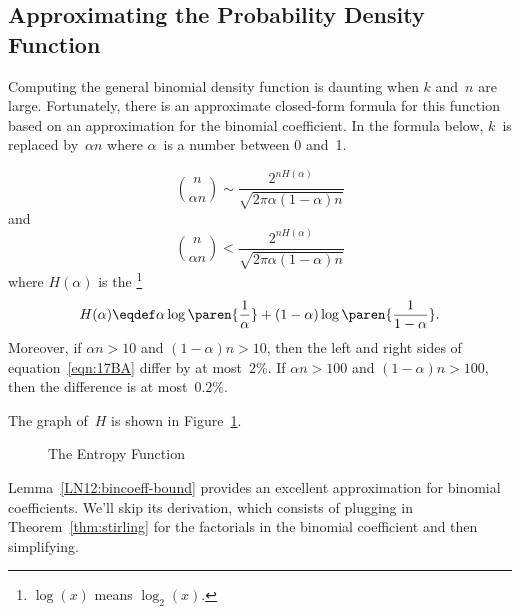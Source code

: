 \begin{editingnotes}

\subsection{Approximating the Probability Density Function}

Computing the general binomial density function is daunting when $k$
and~$n$ are large.  Fortunately, there is an approximate closed-form
formula for this function based on an approximation for the binomial
coefficient.  In the formula below, $k$~is replaced by~$\alpha n$
where $\alpha$~is a number between 0 and~1.
%
\begin{lemma}\label{LN12:bincoeff-bound}
\begin{equation}\label{eqn:17BA}
\binom{n}{\alpha n}
        \sim \frac{2^{n H(\alpha)}}{\sqrt{2 \pi \alpha (1 - \alpha) n}}
\end{equation}
and
\begin{equation}\label{eqn:17A3}
\binom{n}{\alpha n} < \frac{ 2^{n H(\alpha)} }
                           { \sqrt{2 \pi \alpha (1 - \alpha) n} }
\end{equation}
where $H(\alpha)$ is the \footnote{$\log(x)$
  means $\log_2(x)$.}
\begin{equation*}
H(\alpha) \eqdef \alpha \log\paren{\frac{1}{\alpha}} +
                (1 - \alpha) \log\paren{\frac{1}{1 - \alpha}}.
\end{equation*}
Moreover, if $\alpha n > 10$ and $(1 - \alpha) n > 10$, then the left
and right sides of equation~\eqref{eqn:17BA} differ by at most~$2\%$.  If
$\alpha n > 100$ and $(1 - \alpha) n > 100$, then the difference is at
most~$0.2\%$.
\end{lemma}

The graph of~$H$ is shown in Figure~\ref{LN12:entropy}.

\begin{figure}


\caption{The Entropy Function}
\label{LN12:entropy}

\end{figure}

Lemma~\eqref{LN12:bincoeff-bound} provides an excellent approximation
for binomial coefficients.  We'll skip its derivation, which consists
of plugging in Theorem~\ref{thm:stirling} for the factorials in the
binomial coefficient and then simplifying.


\end{editingnotes}
